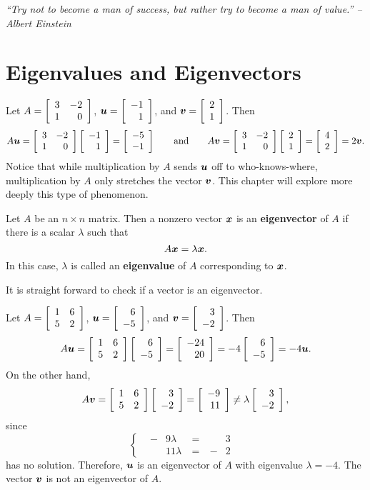 \begin{center} 
\emph{``Try not to become a man of success, but rather try to become a man of value.'' -- Albert Einstein}
\end{center}

\section{Eigenvalues and Eigenvectors}\label{sec:eigen}
\begin{Exam} Let $A=\mtx{rr}{3&-2\\1&0}$, $\bb u = \vr{-1\\1}$, and $\bb v = \vr{2\\1}$. Then 
\[A\bb u = \mtx{rr}{3&-2\\1&0}\vr{-1\\1} = \vr{-5\\-1}\qquad\text{and}\qquad A\bb v =\mtx{rr}{3&-2\\1&0}\vr{2\\1} = \vr{4\\2} = 2\bb v.\] Notice that while multiplication by $A$ sends $\bb u$ off to who-knows-where, multiplication by $A$ only stretches the vector $\bb v$. This chapter will explore more deeply this type of phenomenon.
\end{Exam}\vs

\begin{Def} Let $A$ be an $n\times n$ matrix. Then a nonzero vector $\bb x$ is an \textbf{eigenvector} of $A$ if there is a scalar $\lambda$ such that
\[A\bb x = \lambda \bb x.\] In this case, $\lambda$ is called an \textbf{eigenvalue} of $A$ corresponding to $\bb x$.
\end{Def}\vs

It is straight forward to check if a vector is an eigenvector.\\

\begin{Exam} Let $A = \mtx{rr}{1&6\\5&2}$, $\bb u = \vr{6\\-5}$, and $\bb v = \vr{3\\-2}$. Then 
\[A\bb u = \mtx{rr}{1&6\\5&2}\vr{6\\-5} = \vr{-24\\20} = -4\vr{6\\-5} = -4\bb u.\] On the other hand,
\[A\bb v = \mtx{rr}{1&6\\5&2}\vr{3\\-2} = \vr{-9\\11} \neq \lambda\vr{3\\-2},\] since 
\[\left\{\begin{alignedat}{100}
&-&9\lambda\ &=\ &&3&\\
&&11\lambda\ &=\ &-&2&
\end{alignedat}\right.\] has no solution. Therefore, $\bb u$ is an eigenvector of $A$ with eigenvalue $\lambda = -4$. The vector $\bb v$ is not an eigenvector of $A$.
\end{Exam}\vs

